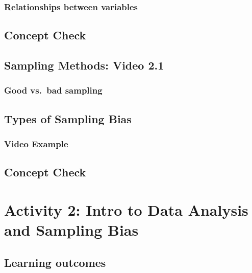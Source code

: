 \documentclass[
]{report}
\begin{document}
\subsubsection*{Relationships between variables}\label{relationships-between-variables}

\subsection{Concept Check}\label{concept-check}

\subsection*{Sampling Methods: Video 2.1}\label{sampling-methods-video-2.1}

\subsubsection*{Good vs.~bad sampling}\label{good-vs.-bad-sampling}

\subsection*{Types of Sampling Bias}\label{types-of-sampling-bias}

\subsubsection*{Video Example}\label{video-example}

\subsection{Concept Check}\label{concept-check-1}

\section{Activity 2: Intro to Data Analysis and Sampling Bias}\label{activity-2-intro-to-data-analysis-and-sampling-bias}

\subsection{Learning outcomes}\label{learning-outcomes-1}
\end{document}
